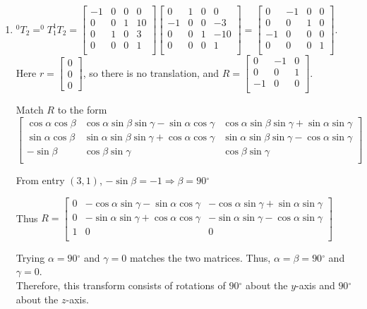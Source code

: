 \documentclass[12pt,letterpaper]{article}
\newcommand{\rca}{\cos\alpha} \newcommand{\rcb}{\cos\beta} \newcommand{\rcg}{\cos\gamma}
\newcommand{\rsa}{\sin\alpha} \newcommand{\rsb}{\sin\beta} \newcommand{\rsg}{\sin\gamma}
\newcommand{\degsym}{\ensuremath{^{\circ}}}
\begin{document}
\begin{enumerate}
\item 
$
^{0}T_2 = ^{0}T_1 ^{1}T_2
= \begin{bmatrix}
-1 & 0 & 0 &  0\\
 0 & 0 & 1 & 10\\
 0 & 1 & 0 &  3\\
 0 & 0 & 0 &  1\\
\end{bmatrix}
\begin{bmatrix}
 0 & 1 & 0 &   0\\
-1 & 0 & 0 &  -3\\
 0 & 0 & 1 & -10\\
 0 & 0 & 0 &   1\\
\end{bmatrix}
= \begin{bmatrix}
 0 & -1 & 0 & 0\\
 0 &  0 & 1 & 0\\
-1 &  0 & 0 & 0\\
 0 &  0 & 0 & 1\\
\end{bmatrix}
$.\\
Here $r = \begin{bmatrix} 0 \\ 0 \\ 0 \end{bmatrix}$, so there is no translation, and
$
R = \begin{bmatrix}
 0 & -1 & 0\\
 0 &  0 & 1\\
-1 &  0 & 0\\
\end{bmatrix}
$.


Match $R$ to the form
\vspace{-.5em}
\begin{equation*}
\begin{bmatrix}
\rca\rcb & \rca\rsb\rsg - \rsa\rcg & \rca\rsb\rsg + \rsa\rsg\\
\rsa\rcb & \rsa\rsb\rsg + \rca\rcg & \rsa\rsb\rsg - \rca\rsg\\
-\rsb & \rcb\rsg & \rcb\rsg \\
\end{bmatrix}
\end{equation*}

From entry $(3, 1)$, $-\rsb = -1 \Rightarrow \beta = 90\degsym$

Thus 
$R = 
\begin{bmatrix}
0 & -\rca\rsg - \rsa\rcg & -\rca\rsg + \rsa\rsg\\
0 & -\rsa\rsg + \rca\rcg & -\rsa\rsg - \rca\rsg\\
1 & 0 & 0 \\
\end{bmatrix}
$

Trying $\alpha = 90\degsym$ and $\gamma = 0$ matches the two matrices. Thus,  $\alpha = \beta = 90\degsym$ and $\gamma = 0$.\\

Therefore, this transform consists of rotations of $90\degsym$ about the $y$-axis and $90\degsym$ about the $z$-axis.

\end{enumerate}
\end{document}
